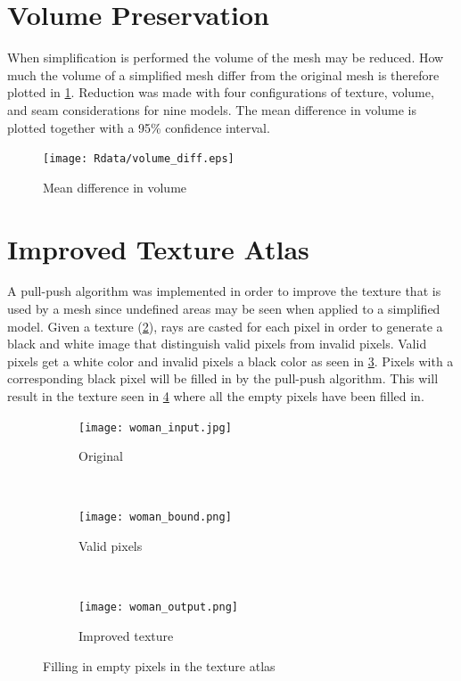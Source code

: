 \clearpage
        
\section{Volume Preservation}
When simplification is performed the volume of the mesh may be reduced. How much the volume of a simplified mesh differ from the original mesh is therefore plotted in \cref{fig:volume_diff}. Reduction was made with four configurations of texture, volume, and seam considerations for nine models. The mean difference in volume is plotted together with a 95\% confidence interval.

\begin{figure}[ht]
  \centering
  \texttt{[image: Rdata/volume\_diff.eps]}
  \caption{Mean difference in volume}
  \label{fig:volume_diff}
\end{figure}

\clearpage

\section{Improved Texture Atlas}
A pull-push algorithm was implemented in order to improve the texture that is used by a mesh since undefined areas may be seen when applied to a simplified model. Given a texture (\cref{fig:original_texture_atlas}), rays are casted for each pixel in order to generate a black and white image that distinguish valid pixels from invalid pixels. Valid pixels get a white color and invalid pixels a black color as seen in \cref{fig:valid_pixels}. Pixels with a corresponding black pixel will be filled in by the pull-push algorithm. This will result in the texture seen in \cref{fig:improved_texture} where all the empty pixels have been filled in.

\begin{figure}[ht]
  \centering
  \begin{subfigure}[b]{.3\textwidth} 
    \texttt{[image: woman\_input.jpg]}
    \caption{Original}
    \label{fig:original_texture_atlas}
  \end{subfigure}
  ~
  \begin{subfigure}[b]{.3\textwidth}
    \texttt{[image: woman\_bound.png]}
    \caption{Valid pixels}
    \label{fig:valid_pixels}
  \end{subfigure}
  ~
  \begin{subfigure}[b]{.3\textwidth}
    \texttt{[image: woman\_output.png]}
    \caption{Improved texture}
    \label{fig:improved_texture}
  \end{subfigure}
  \caption{Filling in empty pixels in the texture atlas}
  \label{fig:improve_texture_atlas}
\end{figure}

